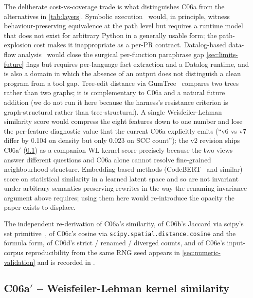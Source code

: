 \documentclass[11pt,letterpaper]{article}
\begin{document}
The deliberate cost-vs-coverage trade is what distinguishes C06a from
the alternatives in \cref{tab:layers}. Symbolic
execution~\cite{cadar2008klee,shoshitaishvili2016sok} would, in
principle, witness behaviour-preserving equivalence at the path level
but requires a runtime model that does not exist for arbitrary Python
in a generally usable form; the path-explosion cost makes it
inappropriate as a per-PR contract. Datalog-based data-flow
analysis~\cite{jordan2016souffle} would close the surgical
per-function paraphrase gap \cref{sec:limits-future} flags but
requires per-language fact extraction and a Datalog runtime, and is
also a domain in which the absence of an output does not distinguish a
clean program from a tool gap. Tree-edit distance via
GumTree~\cite{falleri2014gumtree} compares two trees rather than two
graphs; it is complementary to C06a and a natural future addition (we
do not run it here because the harness's resistance criterion is
graph-structural rather than tree-structural). A single
Weisfeiler-Lehman~\cite{shervashidze2011weisfeiler} similarity score
would compress the eight features down to one number and lose the
per-feature diagnostic value that the current C06a explicitly emits
(``v6 vs v7 differ by 0.104 on density but only 0.023 on SCC count'');
the v2 revision ships C06a$'$ (\cref{sec:c06aprime}) as a
companion WL kernel score precisely because the two views answer
different questions and C06a alone cannot resolve fine-grained
neighbourhood structure.
Embedding-based methods (CodeBERT~\cite{feng2020codebert} and similar)
score on statistical similarity in a learned latent space and so are
not invariant under arbitrary semantics-preserving rewrites in the way
the renaming-invariance argument above requires; using them here would
re-introduce the opacity the paper exists to displace.

The independent re-derivation of C06a's similarity, of C06b's Jaccard
via scipy's set primitive~\cite{virtanen2020scipy}, of C06c's cosine
via \texttt{scipy.spatial.distance.cosine} and the formula form, of
C06d's strict / renamed / diverged counts, and of C06e's input-corpus
reproducibility from the same RNG seed appears in
\cref{sec:numeric-validation} and is recorded in
.

\subsection{C06a$'$ -- Weisfeiler-Lehman kernel similarity}
\label{sec:c06aprime}
\end{document}
